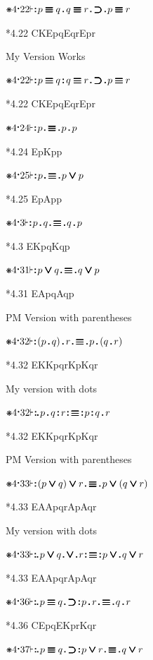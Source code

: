 \documentclass[12pt]{article}
\newcommand{\pmthm}{\mathpunct{\text{\scalebox{.5}[1]{$\boldsymbol\vdash$}}}} %
\newcommand{\pmast}{\text{\resizebox{!}{.75\height}{\ding{107}}}} %
\newcommand{\pmcdot}{\text{\raisebox{.05cm}{$\boldsymbol\cdot$}}} %
\newcommand{\pmd}{\hbox{\rule{.3ex}{.3ex}}} %
\newcommand{\pmdd}{\overset{\pmd}{\pmd}} %
\newcommand{\pmdot}{\mathinner{\pmd}}
\newcommand{\pmdott}{\mathinner{\pmdd}}
\newcommand{\pmdottt}{\mathinner{\pmdd\hspace{1pt}\pmd}}
\newcommand{\pmor}{\mathbin{\ooalign{$\boldsymbol{\vee}\mkern.5mu$\hidewidth\cr$\boldsymbol{\vee}$\cr\hidewidth$\mkern.5mu\boldsymbol{\vee}$}}}
\newcommand{\pmimp}{\mathbin{\ooalign{$\boldsymbol{\supset}\mkern.5mu$\hidewidth\cr$\boldsymbol{\supset}$\cr\hidewidth$\mkern.5mu\boldsymbol{\supset}$}}} %
\newcommand{\pmand}{\mathbin{\pmd}}%
\newcommand{\pmandd}{\mathbin{\pmdd}}
\newcommand{\pmiff}{\mathbin{\ooalign{$\boldsymbol{\equiv}\mkern.5mu$\hidewidth\cr$\boldsymbol{\equiv}$\cr\hidewidth$\mkern.5mu\boldsymbol{\equiv}$}}} %
\begin{document}
$\pmast 4 \pmcdot 22 \pmthm \pmdott p \pmiff q \pmand q \pmiff r \pmdot \pmimp \pmdot p \pmiff r$

*4.22 CKEpqEqrEpr

My Version Works

$\pmast 4 \pmcdot 22 \pmthm \pmdott p \pmiff q \pmandd q \pmiff r \pmdot \pmimp \pmdot p \pmiff r$

*4.22 CKEpqEqrEpr

$\pmast 4 \pmcdot 24 \pmthm \pmdott p \pmdot \pmiff \pmdot p \pmand p $

*4.24 EpKpp

$\pmast 4 \pmcdot 25 \pmthm \pmdott p \pmdot \pmiff \pmdot p \pmor p $

*4.25 EpApp

$\pmast 4 \pmcdot 3 \pmthm \pmdott p \pmand q \pmdot \pmiff \pmdot q \pmand p $

*4.3 EKpqKqp

$\pmast 4 \pmcdot 31 \pmthm \pmdott p \pmor q \pmdot \pmiff \pmdot q \pmor p $

*4.31 EApqAqp

PM Version with parentheses

$\pmast 4 \pmcdot 32 \pmthm \pmdott ( p \pmand q ) \pmand r \pmdot  \pmiff \pmdot p \pmand ( q \pmand r )      $

*4.32 EKKpqrKpKqr

My version with dots

$\pmast 4 \pmcdot 32 \pmthm \pmdottt p \pmand q \pmandd r \pmdott  \pmiff \pmdott p \pmandd q \pmand r      $

*4.32 EKKpqrKpKqr

PM Version with parentheses

$\pmast 4 \pmcdot 33 \pmthm \pmdott ( p \pmor q ) \pmor r \pmdot  \pmiff \pmdot p \pmor ( q \pmor r )      $

*4.33 EAApqrApAqr

My version with dots

$\pmast 4 \pmcdot 33 \pmthm \pmdottt p \pmor q \pmdot \pmor \pmdot r \pmdott  \pmiff \pmdott p \pmor \pmdot q \pmor r      $

*4.33 EAApqrApAqr

$\pmast 4 \pmcdot 36 \pmthm \pmdottt p \pmiff q \pmdot \pmimp \pmdott p \pmand r \pmdot \pmiff \pmdot q \pmand r     $

*4.36 CEpqEKprKqr


$\pmast 4 \pmcdot 37 \pmthm \pmdottt p \pmiff q \pmdot \pmimp \pmdott p \pmor r \pmdot \pmiff \pmdot q \pmor r     $
\end{document}

